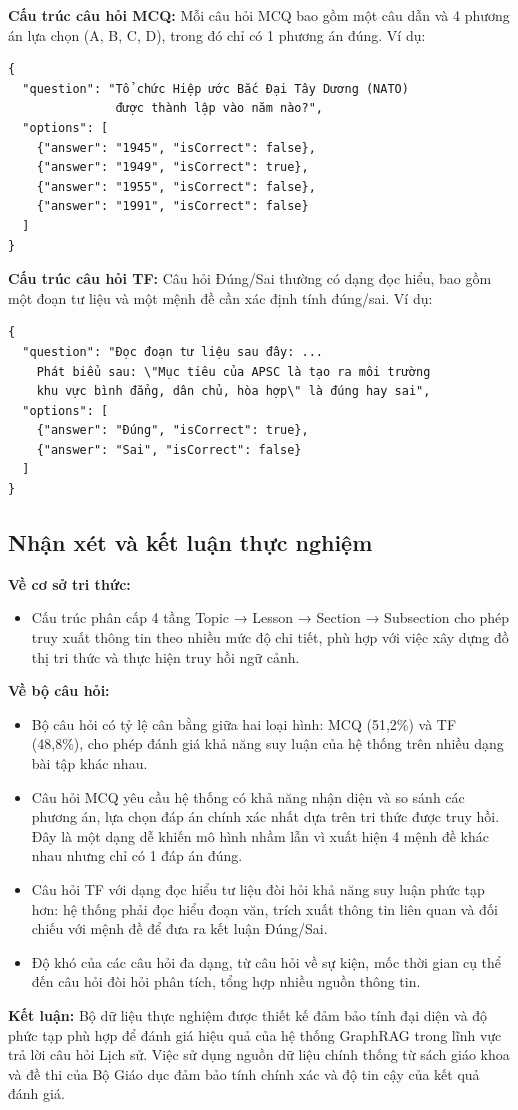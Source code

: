 \textbf{Cấu trúc câu hỏi MCQ:}
Mỗi câu hỏi MCQ bao gồm một câu dẫn và 4 phương án lựa chọn (A, B, C, D), trong đó chỉ có 1 phương án đúng. Ví dụ:

\begin{verbatim}
{
  "question": "Tổ chức Hiệp ước Bắc Đại Tây Dương (NATO) 
               được thành lập vào năm nào?",
  "options": [
    {"answer": "1945", "isCorrect": false},
    {"answer": "1949", "isCorrect": true},
    {"answer": "1955", "isCorrect": false},
    {"answer": "1991", "isCorrect": false}
  ]
}
\end{verbatim}

\textbf{Cấu trúc câu hỏi TF:}
Câu hỏi Đúng/Sai thường có dạng đọc hiểu, bao gồm một đoạn tư liệu và một mệnh đề cần xác định tính đúng/sai. Ví dụ:

\begin{verbatim}
{
  "question": "Đọc đoạn tư liệu sau đây: ... 
    Phát biểu sau: \"Mục tiêu của APSC là tạo ra môi trường 
    khu vực bình đẳng, dân chủ, hòa hợp\" là đúng hay sai",
  "options": [
    {"answer": "Đúng", "isCorrect": true},
    {"answer": "Sai", "isCorrect": false}
  ]
}
\end{verbatim}

\subsection{Nhận xét và kết luận thực nghiệm}

\textbf{Về cơ sở tri thức:}
\begin{itemize}
    \item Cấu trúc phân cấp 4 tầng Topic → Lesson → Section → Subsection cho phép truy xuất thông tin theo nhiều mức độ chi tiết, phù hợp với việc xây dựng đồ thị tri thức và thực hiện truy hồi ngữ cảnh.
\end{itemize}
\textbf{Về bộ câu hỏi:}
\begin{itemize}
    \item Bộ câu hỏi có tỷ lệ cân bằng giữa hai loại hình: MCQ (51,2\%) và TF (48,8\%), cho phép đánh giá khả năng suy luận của hệ thống trên nhiều dạng bài tập khác nhau.
    \item Câu hỏi MCQ yêu cầu hệ thống có khả năng nhận diện và so sánh các phương án, lựa chọn đáp án chính xác nhất dựa trên tri thức được truy hồi. Đây là một dạng dễ khiến mô hình nhầm lẫn vì xuất hiện 4 mệnh đề khác nhau nhưng chỉ có 1 đáp án đúng.
    \item Câu hỏi TF với dạng đọc hiểu tư liệu đòi hỏi khả năng suy luận phức tạp hơn: hệ thống phải đọc hiểu đoạn văn, trích xuất thông tin liên quan và đối chiếu với mệnh đề để đưa ra kết luận Đúng/Sai.
    \item Độ khó của các câu hỏi đa dạng, từ câu hỏi về sự kiện, mốc thời gian cụ thể đến câu hỏi đòi hỏi phân tích, tổng hợp nhiều nguồn thông tin.
\end{itemize}
\textbf{Kết luận:}
Bộ dữ liệu thực nghiệm được thiết kế đảm bảo tính đại diện và độ phức tạp phù hợp để đánh giá hiệu quả của hệ thống GraphRAG trong lĩnh vực trả lời câu hỏi Lịch sử. Việc sử dụng nguồn dữ liệu chính thống từ sách giáo khoa và đề thi của Bộ Giáo dục đảm bảo tính chính xác và độ tin cậy của kết quả đánh giá.